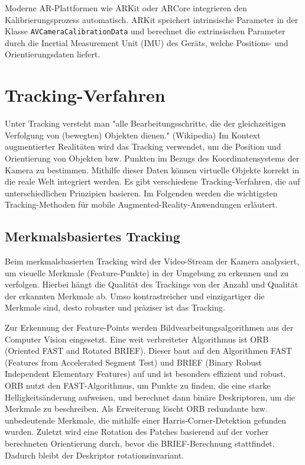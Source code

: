 Moderne AR-Plattformen wie ARKit oder ARCore integrieren den Kalibrierungsprozess automatisch. ARKit speichert intrinsische Parameter in der Klasse \texttt{AVCameraCalibrationData} und berechnet die extrinsischen Parameter durch die Inertial Measurement Unit (IMU) des Geräts, welche Positions- und Orientierungsdaten liefert.

\section{Tracking-Verfahren}

Unter Tracking versteht man "alle Bearbeitungsschritte, die der gleichzeitigen Verfolgung von (bewegten) Objekten dienen." (Wikipedia) Im Kontext augmentierter Realitäten wird das Tracking verwendet, um die Position und Orientierung von Objekten bzw. Punkten im Bezugs des Koordinatensystems der Kamera zu bestimmen. Mithilfe dieser Daten können virtuelle Objekte korrekt in die reale Welt integriert werden. Es gibt verschiedene Tracking-Verfahren, die auf unterschiedlichen Prinzipien basieren. Im Folgenden werden die wichtigsten Tracking-Methoden für mobile Augmented-Reality-Anwendungen erläutert.

\subsection{Merkmalsbasiertes Tracking}

Beim merkmalsbasierten Tracking wird der Video-Stream der Kamera analysiert, um visuelle Merkmale (Feature-Punkte) in der Umgebung zu erkennen und zu verfolgen. Hierbei hängt die Qualität des Trackings von der Anzahl und Qualität der erkannten Merkmale ab. Umso kontrastreicher und einzigartiger die Merkmale sind, desto robuster und präziser ist das Tracking. 

Zur Erkennung der Feature-Points werden Bildvearbeitungsalgorithmen aus der Computer Vision eingesetzt. Eine weit verbreiteter Algorithmus ist ORB (Oriented FAST and Rotated BRIEF). Dieser baut auf den Algorithmen FAST (Features from Accelerated Segment Test) und BRIEF (Binary Robust Independent Elementary Features) auf und ist besonders effizient und robust. ORB nutzt den FAST-Algorithmus, um Punkte zu finden, die eine starke Helligkeitsänderung aufweisen, und berechnet dann binäre Deskriptoren, um die Merkmale zu beschreiben. Als Erweiterung löscht ORB redundante bzw. unbedeutende Merkmale, die mithilfe einer Harris-Corner-Detektion gefunden wurden. Zuletzt wird eine Rotation des Patches basierend auf der vorher berechneten Orientierung durch, bevor die BRIEF-Berechnung stattfindet. Dadurch bleibt der Deskriptor rotationsinvariant.

